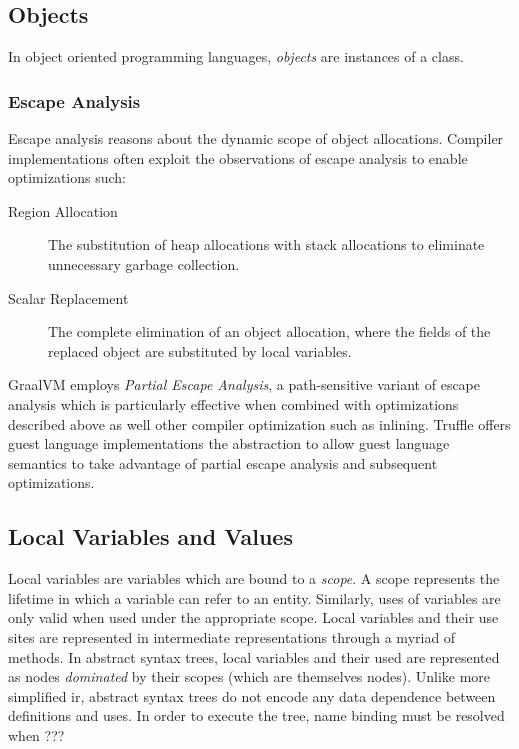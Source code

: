 \subsection*{Objects}

In object oriented programming languages, \textit{objects} are instances of a class.

\subsubsection{Escape Analysis}

Escape analysis\cite{escape-analysis} reasons about the dynamic scope of object allocations. 
Compiler implementations often exploit the observations of escape analysis to enable optimizations such:

\begin{description}
	\item[Region Allocation\cite{java:escape-analysis}\cite{tofte:region-memory}] The substitution of heap allocations with stack allocations to eliminate unnecessary garbage collection.
	\item[Scalar Replacement\cite{java:escape-analysis-optimizations}] The complete elimination of an object allocation, where the fields of the replaced object are substituted by local variables.
\end{description}

GraalVM employs \textit{Partial Escape Analysis}\cite{java:partial-escape-analysis}, a path-sensitive variant of escape analysis which is particularly effective when combined with optimizations described above as well other compiler optimization such as inlining. 
Truffle offers guest language implementations the  abstraction to allow guest language semantics to take advantage of partial escape analysis and subsequent optimizations.

\subsection*{Local Variables and Values} 

Local variables are variables which are bound to a \textit{scope}. 
A scope represents the lifetime in which a variable can refer to an entity. 
Similarly, uses of variables are only valid when used under the appropriate scope. 
Local variables and their use sites are represented in intermediate representations through a myriad of methods. 
In abstract syntax trees, local variables and their used are represented as nodes \textit{dominated} by their scopes (which are themselves nodes). 
Unlike more simplified \acrshort{ir}, abstract syntax trees do not encode any data dependence between definitions and uses\cite{ssa}. 
In order to execute the tree, name binding must be resolved when ???

